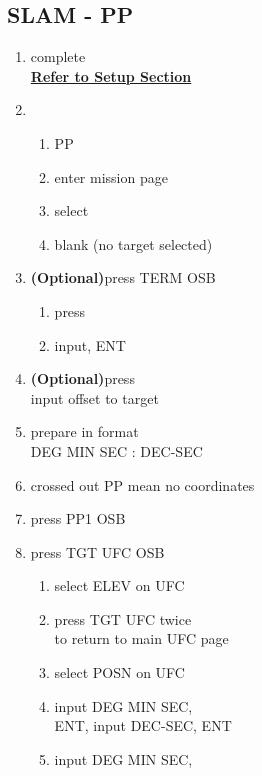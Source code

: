 \documentclass[fontHelvetica, widesubsec]{TechCheck}
\begin{document}
	\subsection{SLAM - PP}
	\begin{enumerate}
		\item {}\dotfill complete \\
		\hfill \hyperref[subsec:84setup]{\textbf{Refer to Setup Section}}
		\item {}
		\begin{enumerate}
			\item {}\dotfill PP
			\item {}\dotfill enter mission page
			\item {}\dotfill select
			\item {}\dotfill blank (no target selected)
		\end{enumerate}
		\item {} \textbf{(Optional)}\dotfill press TERM OSB
		\begin{enumerate}
			\item {}\dotfill press
			\item {}\dotfill input, ENT
		\end{enumerate}
		\item {} \textbf{(Optional)}\dotfill press \\
		\hfill input offset to target
		\item {}\dotfill prepare in format \\ \hfill DEG MIN SEC : DEC-SEC
		\item {}\dotfill crossed out PP mean no coordinates
		\item {}\dotfill press PP1 OSB
		\item {}\dotfill press TGT UFC OSB
		\begin{enumerate}
			\item {}\dotfill select ELEV on UFC
			\item {}\dotfill press TGT UFC twice\\
			\hfill to return to main UFC page
			\item {}\dotfill select POSN on UFC
			\item {}\dotfill input DEG MIN SEC, \\
			\hfill ENT, input DEC-SEC, ENT
			\item {}\dotfill input DEG MIN SEC, \\

\end{enumerate}
\end{enumerate}
\end{document}
